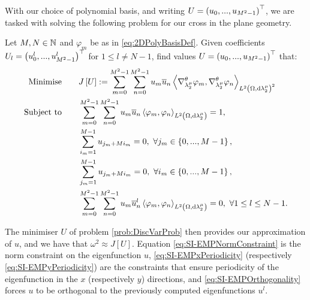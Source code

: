 With our choice of polynomial basis, and writing $U = \left( u_0,...,u_{M^2-1} \right)^\top$, we are tasked with solving the following problem for our cross in the plane geometry.
\begin{problem} \label{prob:DiscVarProb}
	Let $M,N\in\mathbb{N}$ and $\varphi_m$ be as in \eqref{eq:2DPolyBasisDef}.
	Given coefficients $U_l=\left( u^l_0,...,u^l_{M^2-1} \right)^\top$ for $1\leq l\neq N-1$, find values $U=\left( u_0,...,u_{M^2-1} \right)^\top$ that:
	\begin{subequations} \label{eq:SI-ExampleMinProb}
		\begin{align}
			\text{Minimise} \quad & \quad J\left[ U \right] := \sum_{m=0}^{M^2-1}\sum_{n=0}^{M^2-1}u_m\overline{u}_n\left\langle \nabla^{\theta}_{\lambda_2^{\mu}}\varphi_m , \nabla^{\theta}_{\lambda_2^{\mu}}\varphi_n \right\rangle_{L^{2}\left( \Omega,\mathrm{d} \lambda_2^{\mu} \right)^2} 
			\label{eq:SI-EMPObjectiveFn} \\
			\text{Subject to} \quad & \quad \sum_{m=0}^{M^2-1}\sum_{n=0}^{M^2-1}u_m\overline{u}_n\left\langle \varphi_m , \varphi_n \right\rangle_{L^{2}\left( \Omega,\mathrm{d} \lambda_2^{\mu} \right)} = 1, 
			\label{eq:SI-EMPNormConstraint} \\
			& \quad \sum_{i_m=1}^{M-1}u_{j_m+Mi_m} = 0, \ \forall j_m\in\left\{ 0,...,M-1 \right\}, 
			\label{eq:SI-EMPxPeriodicity} \\
			& \quad \sum_{j_m=1}^{M-1}u_{j_m+Mi_m} = 0, \ \forall i_m\in\left\{ 0,...,M-1 \right\},
			\label{eq:SI-EMPyPeriodicity} \\
			& \quad \sum_{m=0}^{M^2-1}\sum_{n=0}^{M^2-1}u_m\overline{u}^l_n\left\langle \varphi_m , \varphi_n \right\rangle_{L^{2}\left( \Omega,\mathrm{d} \lambda_2^{\mu} \right)} = 0, \ \forall 1\leq l\leq N-1.
			\label{eq:SI-EMPOrthogonality}
		\end{align}
	\end{subequations}
\end{problem}
The minimiser $U$ of problem \ref{prob:DiscVarProb} then provides our approximation of $u$, and we have that $\omega^2 \approx J[U]$.
Equation \eqref{eq:SI-EMPNormConstraint} is the norm constraint on the eigenfunction $u$, \eqref{eq:SI-EMPxPeriodicity} (respectively \eqref{eq:SI-EMPyPeriodicity}) are the constraints that ensure periodicity of the eigenfunction in the $x$ (respectively $y$) directions, and \eqref{eq:SI-EMPOrthogonality} forces $u$ to be orthogonal to the previously computed eigenfunctions $u^l$.

